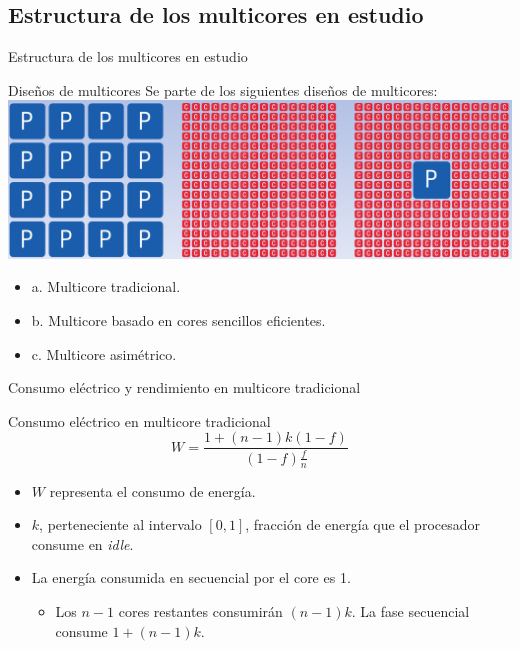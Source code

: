 \documentclass[utf8]{beamer}
\begin{document}
\subsection*{Estructura de los multicores en estudio}
\begin{frame}{Estructura de los multicores en estudio}
    \begin{block}{Diseños de multicores}
        Se parte de los siguientes diseños de multicores:
        \\
        \center\includegraphics[width=.8\linewidth]{figures/amd_power_structures}
        
        \begin{itemize}
            \item a. Multicore tradicional. 
            \item b. Multicore basado en cores sencillos eficientes.
            \item c. Multicore asimétrico.
        \end{itemize}
    \end{block}    
    
\end{frame}

\begin{frame}{Consumo eléctrico y rendimiento en multicore tradicional}
    \begin{block}{Consumo eléctrico en multicore tradicional}
        $$ W = \frac{1 + (n - 1)k(1-f)}{(1 - f)\frac{f}{n}} $$
        \begin{itemize}
             \item $ W $ representa el consumo de energía.
             \item $ k $, perteneciente al intervalo $ [0,1] $, fracción de energía que el procesador consume en \textit{idle}.
             \item La energía consumida en secuencial por el core es 1.
                \begin{itemize}
                    \item Los $ n -1 $ cores restantes consumirán $ (n -1)k $. La fase secuencial consume $ 1 +  (n -1)k $.
                \end{itemize}
        \end{itemize}
          
    
    \end{block}
    
    
\end{frame}
\end{document}
